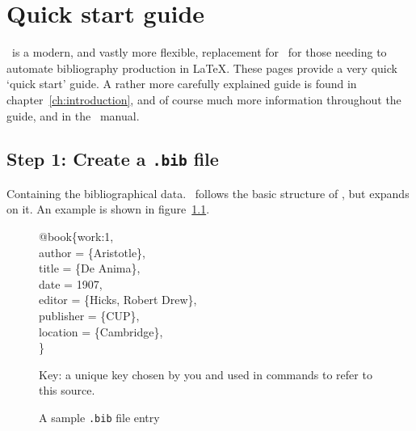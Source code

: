 \chapter{Quick start guide}\label{ch:quickstart}

\biblatex\ is a modern, and vastly more flexible, replacement for
\bibtex\ for those needing to automate bibliography production in
\LaTeX. These pages provide a very quick `quick start' guide. A rather
more carefully explained guide is found in
chapter~\ref{ch:introduction}, and of course much more information
throughout the guide, and in the \biblatex\ manual.

\section{Step 1: Create a \texttt{.bib} file}
Containing the bibliographical data. \biblatex\ follows the basic
structure of \bibtex, but expands on
it. An example is shown in figure~\ref{quickstart:bib}.

\begin{figure}
\strut
  \begin{minipage}[t]{0.7\linewidth}
    \ttfamily
 @book\{\colorbox{blue!15}{work:1},\\
  author       = \{Aristotle\},\\
  title        = \{De Anima\},\\
  date         = 1907,\\
  editor       = \{Hicks, Robert Drew\},\\
  publisher    = \{CUP\},\\
  location     = \{Cambridge\},\\
\}\\
\end{minipage}\begin{minipage}[t]{0.7\linewidth}
  \small\sffamily\strut\vspace{1pc}
  
   Key: a unique
key chosen by you and used in  commands to refer to this
source.
\end{minipage}
\caption{A sample \texttt{.bib} file entry}
\label{quickstart:bib}
\end{figure}

